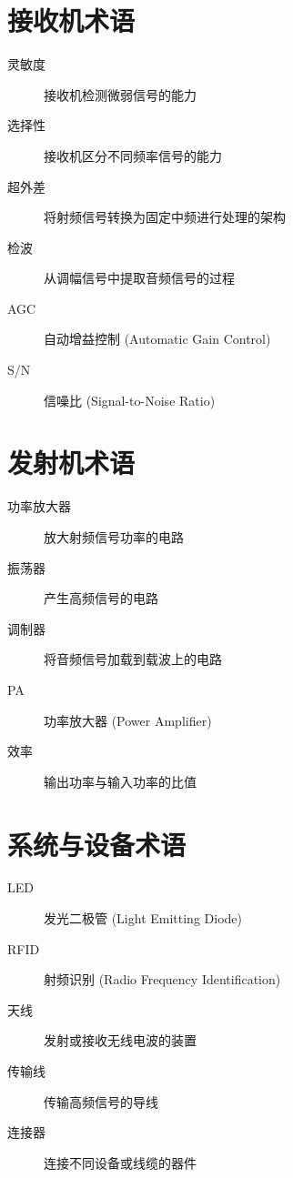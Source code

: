 \section{接收机术语}

\begin{description}
    \item[灵敏度] 接收机检测微弱信号的能力
    \item[选择性] 接收机区分不同频率信号的能力
    \item[超外差] 将射频信号转换为固定中频进行处理的架构
    \item[检波] 从调幅信号中提取音频信号的过程
    \item[AGC] 自动增益控制 (Automatic Gain Control)
    \item[S/N] 信噪比 (Signal-to-Noise Ratio)
\end{description}

\section{发射机术语}

\begin{description}
    \item[功率放大器] 放大射频信号功率的电路
    \item[振荡器] 产生高频信号的电路
    \item[调制器] 将音频信号加载到载波上的电路
    \item[PA] 功率放大器 (Power Amplifier)
    \item[效率] 输出功率与输入功率的比值
\end{description}

\section{系统与设备术语}

\begin{description}
    \item[LED] 发光二极管 (Light Emitting Diode)
    \item[RFID] 射频识别 (Radio Frequency Identification)
    \item[天线] 发射或接收无线电波的装置
    \item[传输线] 传输高频信号的导线
    \item[连接器] 连接不同设备或线缆的器件
\end{description}